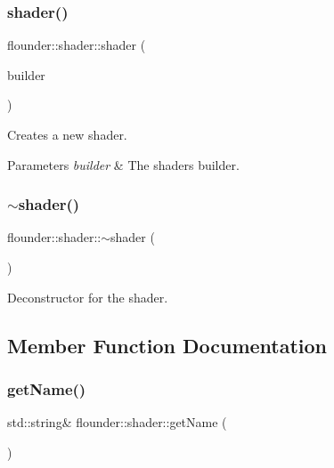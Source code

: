 \subsubsection{\texorpdfstring{shader()}{shader()}}
{\footnotesize\ttfamily flounder\+::shader\+::shader (\begin{DoxyParamCaption}\item[{\hyperlink{classflounder_1_1shader_1_1builder}{builder} $\ast$}]{builder }\end{DoxyParamCaption})\hspace{0.3cm}{\ttfamily [protected]}}



Creates a new shader. 


\begin{DoxyParams}{Parameters}
{\em builder} & The shaders builder. \\
\hline
\end{DoxyParams}
\mbox{\label{classflounder_1_1shader_abd3f0fc712e7e178f18bf275c85e3337}} 
\subsubsection{\texorpdfstring{$\sim$shader()}{~shader()}}
{\footnotesize\ttfamily flounder\+::shader\+::$\sim$shader (\begin{DoxyParamCaption}{ }\end{DoxyParamCaption})}



Deconstructor for the shader. 



\subsection{Member Function Documentation}
\mbox{\label{classflounder_1_1shader_a5971b780ec6535aeb0ca70fefd41daa9}} 
\subsubsection{\texorpdfstring{get\+Name()}{getName()}}
{\footnotesize\ttfamily std\+::string\& flounder\+::shader\+::get\+Name (\begin{DoxyParamCaption}{ }\end{DoxyParamCaption})\hspace{0.3cm}{\ttfamily [inline]}}



